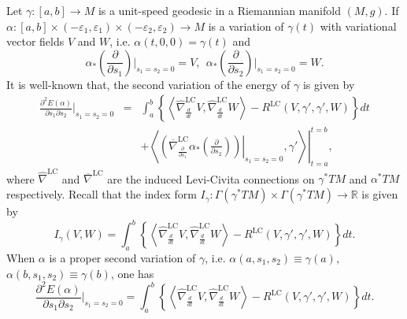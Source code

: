 \documentclass[12pt, reqno]{amsart}
\theoremstyle{plain}
\theoremstyle{definition}
\newcommand{\p}{\partial}
\renewcommand{\bar}{\overline}
\newcommand{\eps}{\varepsilon}
\newcommand{\beq}{\begin{equation}}
\newcommand{\eeq}{\end{equation}}
\renewcommand{\hat}{\widehat}
\renewcommand{\>}{\rightarrow}
\newcommand{\R}{{\mathbb R}}
\newcommand{\LL}{\left\langle}
\newcommand{\RL}{\right\rangle}
\newcommand{\MLC}{\mathrm{LC}}
\renewcommand{\>}{\rightarrow}
\renewcommand{\p}{{\partial}}
\numberwithin{equation}{section} %
\begin{document}
   Let $\gamma:[a,b]\to M$ is a unit-speed geodesic in a Riemannian manifold $(M,g)$. If   $\alpha:[a,b]\times(-\eps_1,\eps_1)\times(-\eps_2,\eps_2)\to M$ is  a variation of $\gamma(t)$ with variational vector fields $V$ and  $W$, i.e.
   $
   \alpha(t,0,0)=\gamma(t)$
   and
   $$
   \alpha_*\left(\frac{\p}{\p s_1}\right)\bigg|_{s_1=s_2=0}=V,\ \ \alpha_*\left(\frac{\p}{\p s_2}\right)\bigg|_{s_1=s_2=0}=W.
   $$
   It is well-known that, the second variation of the energy of $\gamma$ is given by
   \begin{eqnarray} \frac{\p^2  E(\alpha)}{\p s_1\p s_2}\bigg|_{s_1=s_2=0}\nonumber&
   =&\int_a^b\left\{\LL\hat{\nabla}^{\text{LC}}_{\frac{d}{dt}}V,\hat{\nabla}^{\text{LC}}_{\frac{d}{dt}}W\RL-R^{\text{LC}}(V,\gamma',\gamma',W)\right\}dt\\&&+\left.\LL\left.\left(\bar{\nabla}^\MLC_{\frac{\p}{\p s_1}}\alpha_*\left(\frac{\p}{\p s_2}\right)\right)\right|_{s_1=s_2=0},\gamma'\RL\right|_{t=a}^{t=b},\label{secondvariation}
   \end{eqnarray} where $\hat\nabla^{\MLC}$  and $\overline\nabla^{\MLC}$ are the induced Levi-Civita connections on $\gamma^*TM$ and $\alpha^*TM$ respectively. Recall that the index form $I_\gamma: \Gamma(\gamma^*TM)\times \Gamma(\gamma^*TM)\>\R$ is given by
   \beq I_\gamma(V,W) =\int_a^b\left\{\LL\hat{\nabla}^{\text{LC}}_{\frac{d}{dt}}V,\hat{\nabla}^{\text{LC}}_{\frac{d}{dt}}W\RL-R^{\text{LC}}(V,\gamma',\gamma',W)\right\}dt. \eeq
   When $\alpha$ is a proper second variation of $\gamma$, i.e. $\alpha(a, s_1,s_2)\equiv\gamma(a)$, $\alpha(b, s_1,s_2)\equiv \gamma(b)$,  one has
   \beq     \frac{\p^2  E(\alpha)}{\p s_1\p s_2}\bigg|_{s_1=s_2=0}
   =\int_a^b\left\{\LL\hat{\nabla}^{\text{LC}}_{\frac{d}{dt}}V,\hat{\nabla}^{\text{LC}}_{\frac{d}{dt}}W\RL-R^{\text{LC}}(V,\gamma',\gamma',W)\right\}dt. \eeq

   \baselineskip
\end{document}
